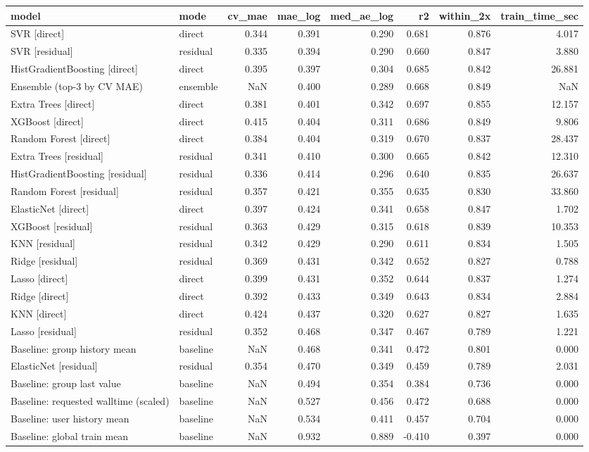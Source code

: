 \begin{tabular}{llrrrrrr}
\toprule
model & mode & cv_mae & mae_log & med_ae_log & r2 & within_2x & train_time_sec \\
\midrule
SVR [direct] & direct & 0.344 & 0.391 & 0.290 & 0.681 & 0.876 & 4.017 \\
SVR [residual] & residual & 0.335 & 0.394 & 0.290 & 0.660 & 0.847 & 3.880 \\
HistGradientBoosting [direct] & direct & 0.395 & 0.397 & 0.304 & 0.685 & 0.842 & 26.881 \\
Ensemble (top-3 by CV MAE) & ensemble & NaN & 0.400 & 0.289 & 0.668 & 0.849 & NaN \\
Extra Trees [direct] & direct & 0.381 & 0.401 & 0.342 & 0.697 & 0.855 & 12.157 \\
XGBoost [direct] & direct & 0.415 & 0.404 & 0.311 & 0.686 & 0.849 & 9.806 \\
Random Forest [direct] & direct & 0.384 & 0.404 & 0.319 & 0.670 & 0.837 & 28.437 \\
Extra Trees [residual] & residual & 0.341 & 0.410 & 0.300 & 0.665 & 0.842 & 12.310 \\
HistGradientBoosting [residual] & residual & 0.336 & 0.414 & 0.296 & 0.640 & 0.835 & 26.637 \\
Random Forest [residual] & residual & 0.357 & 0.421 & 0.355 & 0.635 & 0.830 & 33.860 \\
ElasticNet [direct] & direct & 0.397 & 0.424 & 0.341 & 0.658 & 0.847 & 1.702 \\
XGBoost [residual] & residual & 0.363 & 0.429 & 0.315 & 0.618 & 0.839 & 10.353 \\
KNN [residual] & residual & 0.342 & 0.429 & 0.290 & 0.611 & 0.834 & 1.505 \\
Ridge [residual] & residual & 0.369 & 0.431 & 0.342 & 0.652 & 0.827 & 0.788 \\
Lasso [direct] & direct & 0.399 & 0.431 & 0.352 & 0.644 & 0.837 & 1.274 \\
Ridge [direct] & direct & 0.392 & 0.433 & 0.349 & 0.643 & 0.834 & 2.884 \\
KNN [direct] & direct & 0.424 & 0.437 & 0.320 & 0.627 & 0.827 & 1.635 \\
Lasso [residual] & residual & 0.352 & 0.468 & 0.347 & 0.467 & 0.789 & 1.221 \\
Baseline: group history mean & baseline & NaN & 0.468 & 0.341 & 0.472 & 0.801 & 0.000 \\
ElasticNet [residual] & residual & 0.354 & 0.470 & 0.349 & 0.459 & 0.789 & 2.031 \\
Baseline: group last value & baseline & NaN & 0.494 & 0.354 & 0.384 & 0.736 & 0.000 \\
Baseline: requested walltime (scaled) & baseline & NaN & 0.527 & 0.456 & 0.472 & 0.688 & 0.000 \\
Baseline: user history mean & baseline & NaN & 0.534 & 0.411 & 0.457 & 0.704 & 0.000 \\
Baseline: global train mean & baseline & NaN & 0.932 & 0.889 & -0.410 & 0.397 & 0.000 \\
\bottomrule
\end{tabular}
